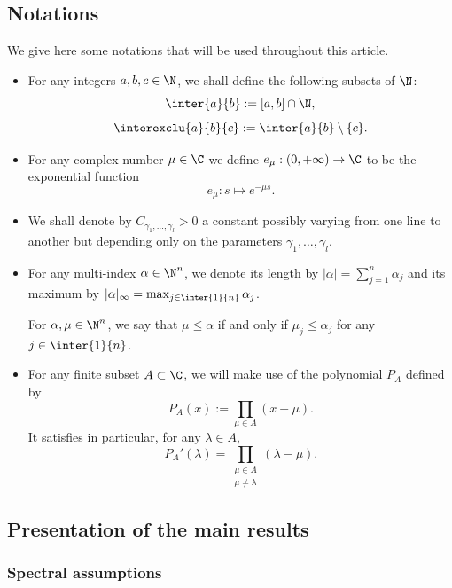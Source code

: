 \subsection{Notations}
We give here some notations that will be used throughout this article.
\begin{itemize}
\item For any integers $a,b,c\in \N$, we shall define the following subsets of $\N$:
\[
\inter{a}{b} := [a,b]\cap \N,
\]
\[
\interexclu{a}{b}{c} := \inter{a}{b}\setminus \{c\}.
\]
\item For any complex number $\mu\in \C$ we define $e_\mu:(0,+\infty)\to \C$ to be the exponential function
\begin{equation}\label{def_emu}
e_\mu:s\mapsto e^{-\mu s}.
\end{equation}
\item We shall denote by $C_{\gamma_1,\dotsc,\gamma_l}>0$ a constant possibly varying from one line to another but depending only on the parameters $\gamma_1,\dotsc,\gamma_l$.
\item For any multi-index $\alpha\in \N^n$, we denote its length by $|\alpha| = \sum_{j=1}^n \alpha_j$ and its maximum by $|\alpha|_\infty=\max_{j\in \inter{1}{n}} \alpha_j$.

For $\alpha,\mu\in \N^n$, we say that $\mu\leq \alpha$ if and only if $\mu_j\leq \alpha_j$ for any $j\in \inter{1}{n}$.
\item For any finite subset $A\subset \C$, we will make use of the polynomial $P_A$ defined by
\begin{equation}\label{Def:P}
P_A(x):=\prod_{\mu\in A} (x-\mu).
\end{equation}
It satisfies in particular, for any $\lambda\in A$,
\begin{equation*}\label{Def:P'}
P_A'(\lambda) = \prod_{ \substack{ \mu \in A \\ \mu \neq \lambda}} (\lambda - \mu).
\end{equation*}
\end{itemize}


\subsection{Presentation of the main results}

\subsubsection{Spectral assumptions} \label{Subsec:SpectralAssumptions}

